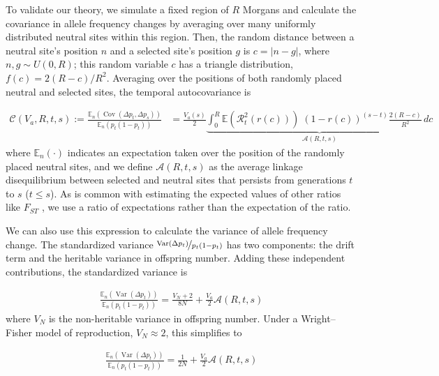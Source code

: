 \documentclass[11pt]{article}
\newcommand{\E}{\mathbb{E}}
\DeclareMathOperator{\var}{Var}
\DeclareMathOperator{\cov}{Cov}
\begin{document}

To validate our theory, we simulate a fixed region of $R$ Morgans and
calculate the covariance in allele frequency changes by averaging over many
uniformly distributed neutral sites within this region. Then, the random
distance between a neutral site's position $n$ and a selected site's position
$g$ is $c = |n - g|$, where $n, g \sim U(0, R)$; this random variable $c$ has a
triangle distribution, $f(c) = 2(R-c) / R^2$. Averaging over the positions of
both randomly placed neutral and selected sites, the temporal autocovariance
is

\begin{align}
  \label{eq:multilocus-triangle}
  \mathcal{C}(V_a, R, t, s) := \frac{\E_n(\cov(\Delta p_t, \Delta p_s))}{\E_n(p_{t} (1-p_{t}))} &= \frac{V_a(s)}{2} \underbrace{\int_0^R \E(\mathcal{R}_t^2(r(c))) \; (1-r(c))^{(s-t)} \frac{2(R-c)}{R^2} \,d c}_{\mathcal{A}(R, t, s)} 
\end{align}
%
where $\E_n(\cdot)$ indicates an expectation taken over the position of the
randomly placed neutral sites, and we define $\mathcal{A}(R, t, s)$ as the
average linkage disequilibrium between selected and neutral sites that persists
from generations $t$ to $s$ ($t \le s$). As is common with estimating the
expected values of other ratios like $F_{ST}$ \parencite{Bhatia2013-zy}, we use
a ratio of expectations rather than the expectation of the ratio.

We can also use this expression to calculate the variance of allele frequency
change. The standardized variance $\nicefrac{\var(\Delta p_t)}{p_t(1-p_t)}$ has
two components: the drift term and the heritable variance in offspring number.
Adding these independent contributions, the standardized variance is

\begin{align}
  \frac{\E_n(\var(\Delta p_t))}{\E_n(p_t(1-p_t))} = \frac{V_N + 2}{8N} + \frac{V_a}{2} \mathcal{A}(R, t, s)
  \label{eq:multilocus-var}
\end{align}
%
where $V_N$ is the non-heritable variance in offspring number. Under a
Wright--Fisher model of reproduction, $V_N \approx 2$, this simplifies to

\begin{align}
  \frac{\E_n(\var(\Delta p_t))}{\E_n(p_t(1-p_t))} = \frac{1}{2N}  + \frac{V_a}{2} \mathcal{A}(R, t, s)
  \label{eq:multilocus-var-2}
\end{align}
\end{document}
